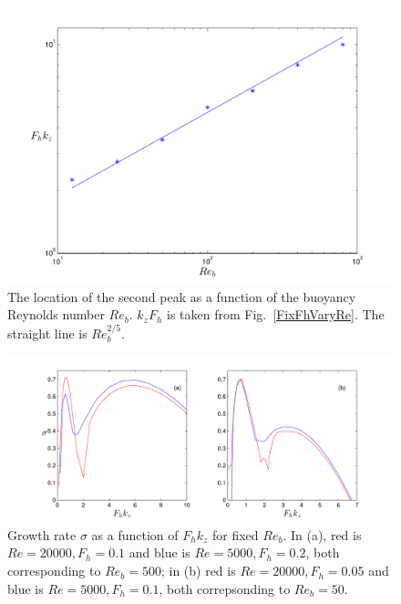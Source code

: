 
\begin{figure}
\begin{center}
\includegraphics[scale=0.65]{second_peak_buoyancy}
\caption{The location of the second peak as a function of the buoyancy Reynolds number $Re_{b}$. $k_{z}F_{h}$ is taken from Fig.~\ref{FixFhVaryRe}. The straight line is $Re_{b}^{2/5}$.}
\label{Buoy}
\end{center}
\end{figure}
\begin{figure}
\begin{center}
\includegraphics[scale=0.65]{buoyancy_reynolds}
\caption{Growth rate $\sigma$ as a function of $F_{h}k_{z}$ for fixed $Re_{b}$. In (a), red is $Re=20000, F_{h}=0.1$ and blue is $Re=5000, F_{h}=0.2$, both corresponding to $Re_{b}=500$; in (b) red is $Re=20000, F_{h}=0.05$ and blue is $Re=5000, F_{h}=0.1$, both correpsonding to $Re_{b}=50$.}
\label{ReBuoy}
\end{center}
\end{figure}


